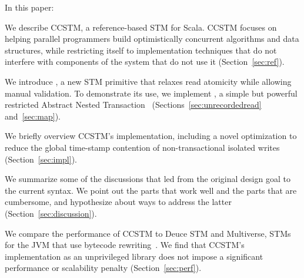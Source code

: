 In this paper:
\begin{packed_enum}

\item We describe CCSTM, a reference-based STM for Scala.  CCSTM focuses
on helping parallel programmers build optimistically concurrent algorithms
and data structures, while restricting itself to implementation techniques
that do not interfere with components of the system that do not use it
(Section~\ref{sec:ref}).

\item We introduce , a new STM primitive that relaxes
read atomicity while allowing manual validation.  To demonstrate its
use, we implement , a simple but powerful restricted 
Abstract Nested Transaction~\cite{harris07abstract}
(Sections~\ref{sec:unrecordedread}
and~\ref{sec:map}).

\item We briefly overview CCSTM's implementation, including a
novel optimization to reduce the global time-stamp contention of
non-transactional isolated writes (Section~\ref{sec:impl}).

\item We summarize some of the discussions that led from the original
design goal to the current syntax.  We point out the parts that work
well and the parts that are cumbersome, and hypothesize about ways to
address the latter (Section~\ref{sec:discussion}).

\item We compare the performance of CCSTM to Deuce STM and Multiverse,
STMs for the JVM that use bytecode rewriting~\cite{deucestm,multiverse}.
We find that CCSTM's implementation as an unprivileged library
does not impose a significant performance or scalability penalty
(Section~\ref{sec:perf}).

\end{packed_enum}

